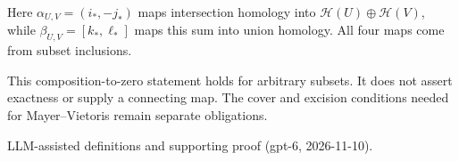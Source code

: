 \documentclass[11pt]{article}
\begin{document}

\bigskip
Here $\alpha_{U,V}=(i_*,-j_*)$ maps intersection homology into
$\mathcal H(U)\oplus\mathcal H(V)$, while $\beta_{U,V}=[k_*,\ell_*]$
maps this sum into union homology. All four maps come from subset inclusions.
\par\medskip
This composition-to-zero statement holds for arbitrary subsets. It does not
assert exactness or supply a connecting map. The cover and excision conditions
needed for Mayer--Vietoris remain separate obligations.
\par\bigskip
{\footnotesize LLM-assisted definitions and supporting proof (gpt-6, 2026-11-10).}
\end{document}
